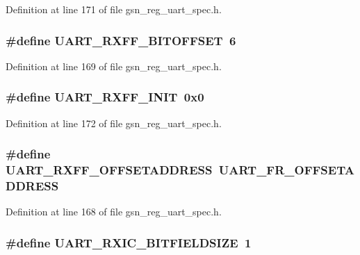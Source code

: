 Definition at line 171 of file gsn\_\-reg\_\-uart\_\-spec.h.

\hypertarget{a00575_afa0faf78e86f805b4d07f023c760bc06}{
\subsubsection[{UART\_\-RXFF\_\-BITOFFSET}]{\setlength{\rightskip}{0pt plus 5cm}\#define UART\_\-RXFF\_\-BITOFFSET~6}}
\label{a00575_afa0faf78e86f805b4d07f023c760bc06}


Definition at line 169 of file gsn\_\-reg\_\-uart\_\-spec.h.

\hypertarget{a00575_ad73017c2950a2390597cd46932a8b99e}{
\subsubsection[{UART\_\-RXFF\_\-INIT}]{\setlength{\rightskip}{0pt plus 5cm}\#define UART\_\-RXFF\_\-INIT~0x0}}
\label{a00575_ad73017c2950a2390597cd46932a8b99e}


Definition at line 172 of file gsn\_\-reg\_\-uart\_\-spec.h.

\hypertarget{a00575_a5336f54af78593f9929462ede1ff6dce}{
\subsubsection[{UART\_\-RXFF\_\-OFFSETADDRESS}]{\setlength{\rightskip}{0pt plus 5cm}\#define UART\_\-RXFF\_\-OFFSETADDRESS~UART\_\-FR\_\-OFFSETADDRESS}}
\label{a00575_a5336f54af78593f9929462ede1ff6dce}


Definition at line 168 of file gsn\_\-reg\_\-uart\_\-spec.h.

\hypertarget{a00575_a69c6acbf5e9489590fad4d63509214f4}{
\subsubsection[{UART\_\-RXIC\_\-BITFIELDSIZE}]{\setlength{\rightskip}{0pt plus 5cm}\#define UART\_\-RXIC\_\-BITFIELDSIZE~1}}
\label{a00575_a69c6acbf5e9489590fad4d63509214f4}


